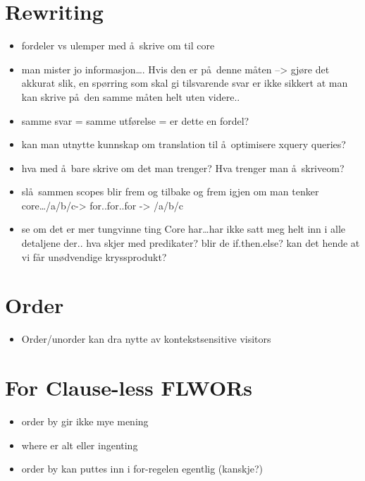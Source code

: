 \section{Rewriting}
\label{sect:disc:rewriting}
\begin{itemize}
  \item fordeler vs ulemper med \aa~skrive om til core
  \item man mister jo informasjon\ldots. Hvis den er p\aa~denne m\aa ten --> gj\o re det akkurat
	  slik, en sp\o rring som skal gi tilsvarende svar er ikke sikkert at man kan
	  skrive p\aa~den samme m\aa ten helt uten videre..  
  \item samme svar = samme utf\o relse = er dette en fordel?
  \item kan man utnytte kunnskap om translation til \aa~optimisere xquery queries?
  \item hva med \aa~bare skrive om det man trenger? Hva trenger man \aa~skriveom?
  \item sl\aa~sammen scopes blir frem og tilbake og frem igjen om man tenker core\ldots /a/b/c-> for..for..for ->
  /a/b/c
  \item se om det er mer tungvinne ting Core har\ldots har ikke satt meg helt inn i alle detaljene der.. hva skjer
  med predikater? blir de if.then.else? kan det hende at vi f\aa r un\o dvendige kryssprodukt?
\end{itemize}





\section{Order}
\label{sect:disc:order}
\begin{itemize}
  \item Order/unorder kan dra nytte av kontekstsensitive visitors
\end{itemize}

\section{For Clause-less FLWORs}
\begin{itemize}
  \item order by gir ikke mye mening
  \item where er alt eller ingenting
  \item order by kan puttes inn i for-regelen egentlig (kanskje?)
\end{itemize}

